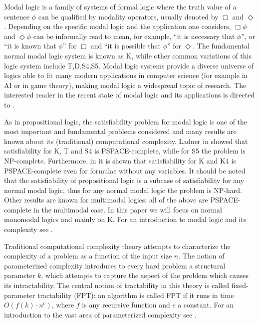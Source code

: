 \documentclass{llncs}
\begin{document}
Modal logic is a family of systems of formal logic where the truth value of a sentence $\phi$ can be qualified by
modality operators, usually denoted by $\Box$ and $\Diamond$. Depending on the specific modal logic and the
application one considers, $\Box\phi$ and $\Diamond\phi$ can be informally read to mean, for example, ``it is
necessary that $\phi$'', or ``it is known that $\phi$'' for $\Box$ and ``it is possible that $\phi$'' for
$\Diamond$. The fundamental normal modal logic system is known as K, while other common variations of this logic
system include T,D,S4,S5. Modal logic systems provide a diverse universe of logics able to fit many modern
applications in computer science (for example in AI or in game theory), making modal logic a widespread topic of
research. The interested reader in the recent state of modal logic and its applications is directed to
\cite{handbook-modal}.

As in propositional logic, the satisfiability problem for modal logic is one of the most important and fundamental
problems considered and many results are known about its (traditional) computational complexity. Ladner in
\cite{lad} showed that satisfiability for K, T and S4 is PSPACE-complete, while for S5 the problem is NP-complete.
Furthermore,
in \cite{DBLP:conf/aiml/ChagrovR02}
it is shown that satisfiability for K and K4 is PSPACE-complete even
for formulae without any variables.
It should be noted that the satisfiability of propositional logic is a subcase of satisfiability for any normal
modal logic, thus for any normal modal logic the problem is NP-hard.  Other results are known for multimodal
logics; all of the above are PSPACE-complete in the multimodal case.  In this paper we will focus on normal
monomodal logics and mainly on K. For an introduction to modal logic and its complexity see
\cite{130913,Fagin1995ReasoningAboutKnowledge}.

Traditional computational complexity theory attempts to characterize the complexity of a problem as a function of
the input size $n$. The notion of parameterized complexity introduces to every hard problem a structural parameter
$k$, which attempts to capture the aspect of the problem which causes its intractability. The central notion of
tractability in this theory is called fixed-parameter tractability (FPT): an algorithm is called FPT if it runs in
time $O(f(k)\cdot n^c)$, where $f$ is any recursive function and $c$ a constant. For an introduction to the vast
area of parameterized complexity see \cite{downey1999pc,flum2006pct}.
\end{document}
